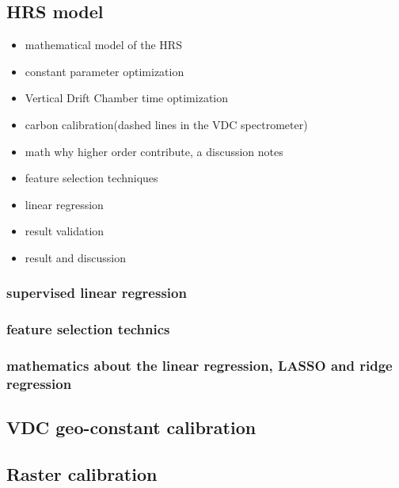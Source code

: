 \subsection{HRS model}

\begin{itemize}
    \item mathematical model of the HRS
    \item constant parameter optimization
    \item Vertical Drift Chamber time optimization
    \item carbon calibration(dashed lines in the VDC spectrometer)
    \item math why higher order contribute, a discussion notes
    \item feature selection techniques
    \item linear regression
    \item result validation
    \item result and discussion
\end{itemize}
\subsubsection{supervised linear regression}
\subsubsection{feature selection technics}
\subsubsection{mathematics about the linear regression, LASSO and ridge regression}

\subsection{VDC geo-constant calibration}
\subsection{Raster calibration}







